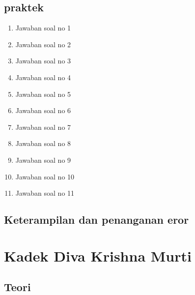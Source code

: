 \subsection{praktek}
\begin{enumerate}
    \item Jawaban soal no 1
    
    \item Jawaban soal no 2
    
    \item Jawaban soal no 3
    
    \item Jawaban soal no 4
    
    \item Jawaban soal no 5
    
    \item Jawaban soal no 6
    
    \item Jawaban soal no 7
    
    \item Jawaban soal no 8
    
    \item Jawaban soal no 9
    
    \item Jawaban soal no 10
    
    \item Jawaban soal no 11
    
\end{enumerate}

\subsection{Keterampilan dan penanganan eror}
    


\section{Kadek Diva Krishna Murti}

\subsection{Teori}

